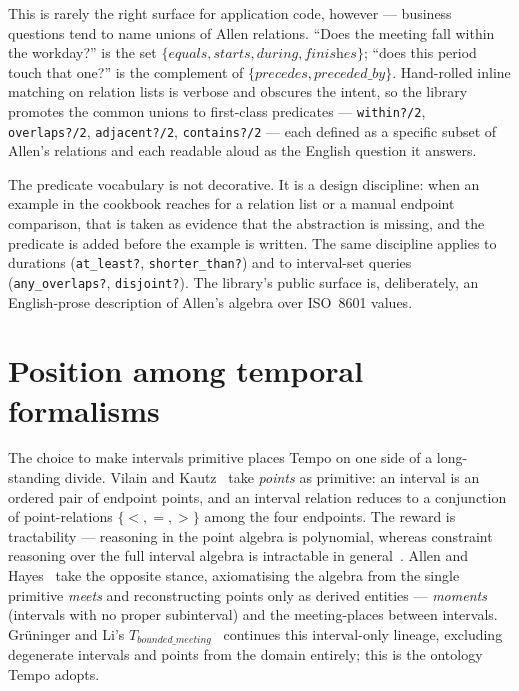This is rarely the right surface for application code, however ---
business questions tend to name unions of Allen relations.
``Does the meeting fall within the workday?'' is the set
$\{\textit{equals}, \textit{starts}, \textit{during}, \textit{finishes}\}$;
``does this period touch that one?'' is the complement of
$\{\textit{precedes}, \textit{preceded\_by}\}$. Hand-rolled inline
matching on relation lists is verbose and obscures the intent, so the
library promotes the common unions to first-class predicates ---
\texttt{within?/2}, \texttt{overlaps?/2}, \texttt{adjacent?/2},
\texttt{contains?/2} --- each defined as a specific subset of Allen's
relations and each readable aloud as the English question it answers.

The predicate vocabulary is not decorative. It is a design discipline:
when an example in the cookbook reaches for a relation list or a
manual endpoint comparison, that is taken as evidence that the
abstraction is missing, and the predicate is added before the example
is written. The same discipline applies to durations
(\texttt{at\_least?}, \texttt{shorter\_than?}) and to interval-set
queries (\texttt{any\_overlaps?}, \texttt{disjoint?}). The library's
public surface is, deliberately, an English-prose description of
Allen's algebra over ISO~8601 values.

\section{Position among temporal formalisms}

The choice to make intervals primitive places Tempo on one side of a
long-standing divide. Vilain and Kautz~\cite{vilainkautz1986} take
\emph{points} as primitive: an interval is an ordered pair of endpoint
points, and an interval relation reduces to a conjunction of
point-relations $\{<,=,>\}$ among the four endpoints. The reward is
tractability --- reasoning in the point algebra is polynomial, whereas
constraint reasoning over the full interval algebra is intractable in
general~\cite{vilainkautz1986,nebel1995}. Allen and
Hayes~\cite{allenhayes1989} take the opposite stance, axiomatising the
algebra from the single primitive \textit{meets} and reconstructing
points only as derived entities --- \emph{moments} (intervals with no
proper subinterval) and the meeting-places between intervals.
Gr\"uninger and Li's $T_{bounded\_meeting}$~\cite{gruninger2017allenontology}
continues this interval-only lineage, excluding degenerate intervals
and points from the domain entirely; this is the ontology Tempo
adopts.


